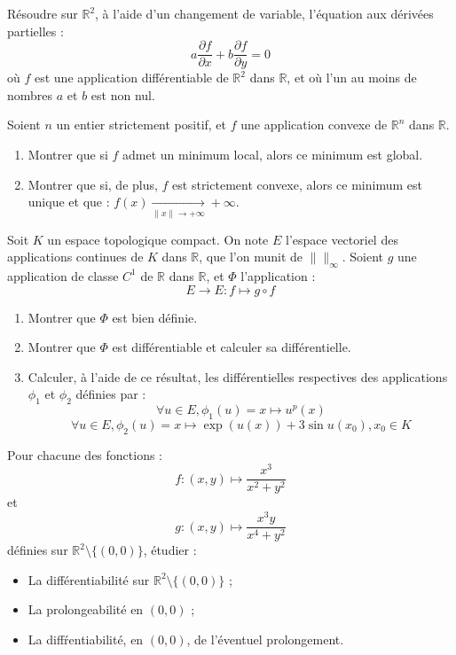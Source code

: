 \begin{exer}
R\'esoudre sur $\mathbb{R}^2$, \`a l'aide d'un changement de variable, l'\'equation aux d\'eriv\'ees partielles :
\[a\frac{\partial{f}}{\partial{x}}+b\frac{\partial{f}}{\partial{y}}=0\]
o\`u $f$ est une application diff\'erentiable de $\mathbb{R}^2$ dans $\mathbb{R}$, et o\`u l'un au moins de nombres $a$ et $b$ est non nul.
\end{exer}

\begin{exer}
Soient $n$ un entier strictement positif, et $f$ une application convexe de $\mathbb{R}^n$ dans $\mathbb{R}$.
\begin{enumerate}
\item Montrer que si $f$ admet un minimum local, alors ce minimum est global.
\item Montrer que si, de plus, $f$ est strictement convexe, alors ce minimum est unique et que : $f(x)\underset{\|x\|\rightarrow +\infty}{\longrightarrow}+\infty$.
\end{enumerate}
\end{exer}

\begin{exer}
Soit $K$ un espace topologique compact. On note $E$ l'espace vectoriel des applications continues de $K$ dans $\mathbb{R}$, que l'on munit de $\| \|_{\infty}$. %
Soient $g$ une application de classe $C^{1}$ de $\mathbb{R}$ dans $\mathbb{R}$, et $\Phi$ l'application :
\[E \rightarrow E : f \mapsto g \circ f\]
\begin{enumerate}
\item Montrer que $\Phi$ est bien définie.
\item Montrer que $\Phi$ est différentiable et calculer sa différentielle.
\item Calculer, à l'aide de ce résultat, les différentielles respectives des applications $\phi_1$ et $\phi_2$ définies par :
\[\forall u \in E , \phi_1 (u) = x \mapsto u^p(x)\]
\[\forall u \in E , \phi_2 (u) = x \mapsto \exp(u(x)) + 3 \sin u(x_0) , x_0 \in K\]
\end{enumerate}
\end{exer}

\begin{exer}
Pour chacune des fonctions :
\[f:(x,y)\mapsto\frac{x^3}{x^2+y^2}\] et \[g:(x,y)\mapsto\frac{x^3y}{x^4+y^2}\]
d\'efinies sur $\mathbb{R}^2\setminus\{(0,0)\}$, \'etudier :

\smallskip
\begin{itemize}
\item La diff\'erentiabilit\'e sur $\mathbb{R}^2\setminus\{(0,0)\}$ ;
\item La prolongeabilit\'e en $(0,0)$ ;
\item La diff\'rentiabilit\'e, en $(0,0)$, de l'\'eventuel prolongement.
\end{itemize}
\end{exer}

